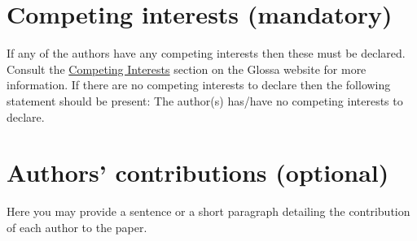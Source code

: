 \documentclass[charis,linguex,biblatex]{glossa}
\begin{document}
\section*{Competing interests (mandatory)}

If any of the authors have any competing interests then these must be declared. Consult the \href{http://www.glossa-journal.org/about/competinginterests/}{Competing Interests} section on the Glossa website for more information. If there are no competing interests to declare then the following statement should be present: The author(s) has/have no competing interests to declare.

\section*{Authors' contributions (optional)}

Here you may provide a sentence or a short paragraph detailing the contribution of each author to the paper.

\nocite{*} %

\printbibliography %
\end{document}
